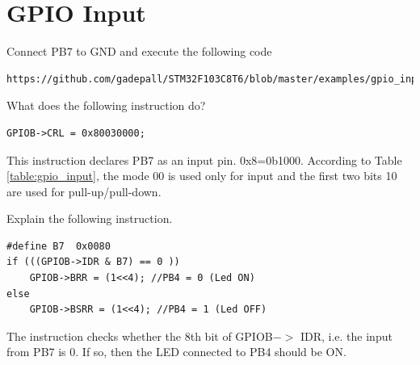 \documentclass[journal,12pt,twocolumn]{IEEEtran}
\begin{document}
\section{GPIO Input}
\begin{problem}
Connect PB7 to GND and execute the following code
\begin{lstlisting}
https://github.com/gadepall/STM32F103C8T6/blob/master/examples/gpio_input_example.c
\end{lstlisting}
\end{problem}
\begin{problem}
What does the following instruction do?
\begin{lstlisting}
GPIOB->CRL = 0x80030000;	
\end{lstlisting}
\end{problem}
\solution
This instruction declares PB7 as an input pin.  0x8=0b1000.  According to Table \ref{table:gpio_input}, the mode 00 is used only for
input and the first two bits 10 are used for pull-up/pull-down.
\begin{table}[!h]
\centering
\small

\caption{}
\label{table:gpio_input}
\end{table}
\begin{problem}
Explain the following instruction.
\begin{lstlisting}
#define B7	0x0080
if (((GPIOB->IDR & B7) == 0 ))  
	GPIOB->BRR = (1<<4); //PB4 = 0 (Led ON)		
else
	GPIOB->BSRR = (1<<4); //PB4 = 1 (Led OFF)					
\end{lstlisting}
\end{problem}
\solution The instruction checks whether the 8th bit of GPIOB$->$ IDR, i.e. the input from PB7  is 0.  If so, then the LED connected to PB4
should be ON. 
\end{document}
